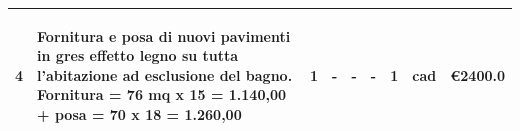 \documentclass[a4paper]{article}
\begin{document}
\begin{tabular}{ | L{6.1mm} |  L{52.4mm} |  L{7mm} | L{7mm} | L{7mm} | L{7mm} | L{8mm} | L{8mm} | L{16mm} |   }
                        \vspace{2.5mm}\begin{spacing}{0}4\end{spacing} &\vspace{2.5mm}\begin{spacing}{0}Fornitura e posa di nuovi pavimenti in gres effetto legno su tutta l'abitazione ad esclusione del bagno. Fornitura = 76 mq x 15 = 1.140,00 + posa = 70 x 18 = 1.260,00\end{spacing} &\vspace{2.5mm}\begin{spacing}{0}1\end{spacing} &\vspace{2.5mm}\begin{spacing}{0}-\end{spacing} &\vspace{2.5mm}\begin{spacing}{0}-\end{spacing} &\vspace{2.5mm}\begin{spacing}{0}-\end{spacing} &\vspace{2.5mm}\begin{spacing}{0}1\end{spacing} &\vspace{2.5mm}\begin{spacing}{0}cad\end{spacing} &\vspace{2.5mm}\begin{spacing}{0}\euro\hfill  2400.0
                        \end{spacing} \\ \hline %


\end{tabular}
\end{document}
